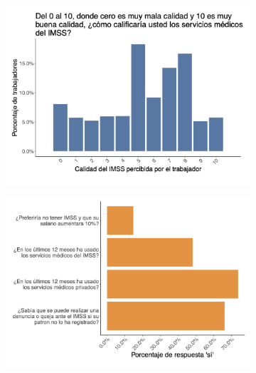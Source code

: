 \documentclass[oneside,11pt]{article}
\begin{document}
\begin{figure}[H]
\begin{center}
    \begin{subfigure}{0.49\textwidth}
    \includegraphics[width=\textwidth]{04_Figures/workey_survey/Exp_15.png}
    \end{subfigure}
    \begin{subfigure}{0.49\textwidth}
    \includegraphics[width=\textwidth]{04_Figures/workey_survey/Exp_16.png}
    \end{subfigure}
    
    \end{center}
\end{figure}



\newpage

\end{document}
